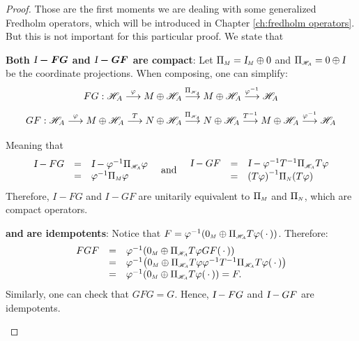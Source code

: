 \begin{teorema}
\begin{proof}
Those are the first moments we are dealing with some generalized Fredholm operators, which will be introduced in Chapter \ref{ch:fredholm operators}. But this is not important for this particular proof. We state that
\begin{itroman}
    \item \label{teo item: I-FG e I-GF sao compactos}\textbf{Both $\boldsymbol{\textsl{I} - FG}$ and $\boldsymbol{\textsl{I} - GF}$ are compact}: Let $\sub\Pi{M} = \sub\Id{M} \oplus 0$ and $\sub\Pi{\HA} = 0 \oplus \Id$ be the coordinate projections. When composing, one can simplify:
\begin{equation*}
    \begin{array}{c}
    FG: \HA \overset{\varphi}{\longto} M\oplus \HA \overset{\sub{\Pi}{\HA} }{\longto} M\oplus \HA \overset{\inv \varphi}{\longto} {\HA}
    \\
    \vphantom{\displaystyle\int\limits^b}GF: \HA \overset{\varphi}{\longto} M\oplus \HA \overset{T}{\longto} N\oplus \HA \overset{\sub\Pi{\HA}}{\longto} N \oplus \HA \overset{\inv T}{\longto} M\oplus \HA \overset{\inv \varphi}{\longto} {\HA}  
    \end{array}
\end{equation*}
Meaning that
\begin{equation*}
    \begin{array}{rcl}
        \Id - FG &=& \Id - \inv \varphi \sub\Pi{\HA}\varphi \\
        &=& \inv \varphi\sub\Pi M \varphi 
    \end{array}
\e 
\begin{array}{rcl}
     \Id - GF &=& \Id - \inv \varphi{\inv T} \sub\Pi{\HA} T\varphi  \\
     &=& \inv{(T\varphi)} \sub\Pi N(T\varphi)
\end{array}
    \end{equation*}
   Therefore, $I-FG$ and $I-GF$ are unitarily equivalent to $\sub\Pi M$ and $\sub \Pi N$, which are compact operators.
    
    \item {}  \textbf{and}  \textbf{are idempotents}: Notice that $F = \inv \varphi(\sub 0M \oplus \sub{\Pi}{\HA} T\varphi(\come))$. Therefore:
    \begin{equation*}
    \begin{array}{rcl}
         FGF &=& \inv \varphi(\sub 0M \oplus \sub{\Pi}{\HA} T\varphi GF(\come)) \\
         &=& \inv \varphi\big(\sub 0M \oplus \sub{\Pi}{\HA} T\varphi\inv \varphi\inv T \sub\Pi{\HA}T\varphi(\come)\big) \\
         &=&\inv \varphi(\sub 0M \oplus \sub{\Pi}{\HA} T\varphi(\come)) = F.
    \end{array}
    \end{equation*}
    Similarly, one can check that $GFG=G$. Hence, $\textsl{I}-FG$ and $\textsl{I} - GF$ are idempotents.


\end{itroman}
\end{proof}
\end{teorema}
